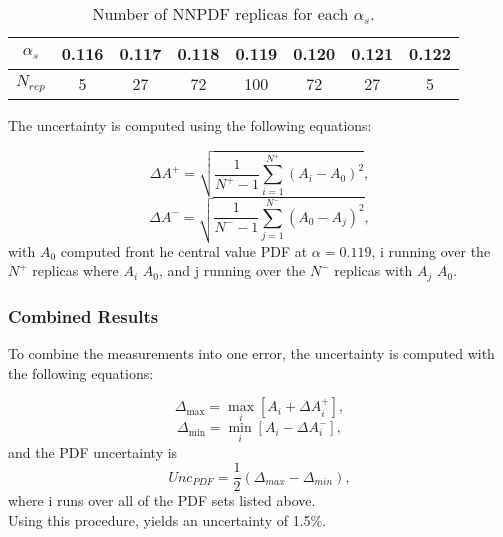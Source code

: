 \begin{table}[h]
\caption{\label{tab:nnPDFsets} Number of NNPDF replicas for each $\alpha _s$.}
\begin{center}
\begin{tabular}{c|ccccccc}\hline
$\alpha _s$         &  0.116 & 0.117 & 0.118 & 0.119 & 0.120 & 0.121 & 0.122 \\ \hline
$N_{rep}$                &  5         &  27      &  72      &   100   &  72     &   27    &    5       \\
\hline
\end{tabular}
\end{center}
\end{table}

The uncertainty is computed using the following equations:

\begin{equation}
\Delta A ^{+} = \sqrt{  \frac{1}{N^{+} - 1} \sum \limits_{i=1}^{N^{+}} (A_i - A_0)^2},
\end{equation}
\begin{equation}
\Delta A ^{-} = \sqrt{  \frac{1}{N^{-} - 1} \sum \limits_{j=1}^{N^{-}} (A_0 - A_j)^2},
\end{equation}
with $A_0$ computed front he central value PDF at $\alpha = 0.119$, i running over the $N^{+}$ replicas where $A_i$ \gt $A_0$, and j running over the $N^{-}$ replicas with $A_j$ \lt $A_0$.\\

\subsubsection{Combined Results}
To combine the measurements into one error, the uncertainty is computed with the following equations:

\begin{equation}
\Delta _{\max} = \underset{i}{\max}  [A_i + \Delta A^{+} _i],
\end{equation}
\begin{equation}
\Delta _{\min} = \underset{i}{\min}  [A_i - \Delta A^{-} _i],
\end{equation}
and the PDF uncertainty is
\begin{equation}
Unc_{PDF} = \frac{1}{2}(\Delta _{max} - \Delta _{min} ),
\end{equation}
where i runs over all of the PDF sets listed above.\\

Using this procedure, yields an uncertainty of 1.5\%.



